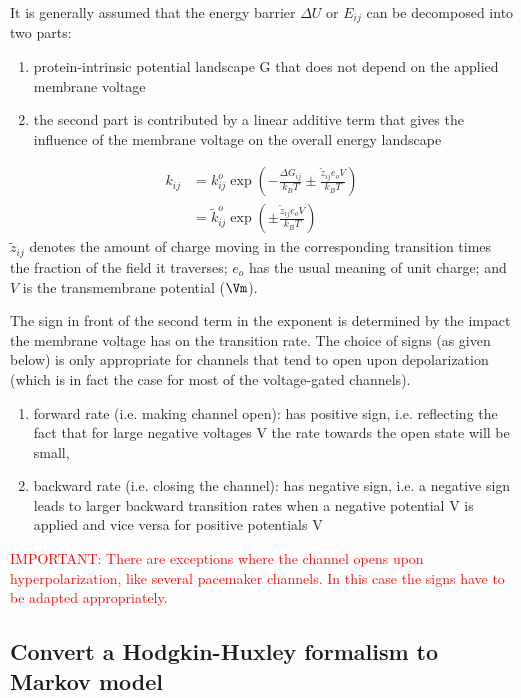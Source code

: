 It is generally assumed that the energy barrier $\Delta U$ or $E_{ij}$
can be decomposed into two parts:
\begin{enumerate}
  \item protein-intrinsic potential landscape G that does not depend on the applied
membrane voltage

   \item the second part is contributed by a linear additive term that gives
the influence of the membrane voltage on the overall energy landscape
\end{enumerate}

\begin{equation}
\begin{split}
k_{ij} &= k_{ij}^o \exp\left( - \frac{\Delta G_{ij}}{k_BT} \pm
\frac{\tilde{z}_{ij} e_o V}{k_BT} \right) \\
      &= \tilde{k}^o_{ij}  \exp\left( \pm
\frac{\tilde{z}_{ij} e_o V}{k_BT} \right)
\end{split}
\end{equation}
$\tilde{z}_{ij}$ denotes the amount of charge moving in the corresponding
transition times the fraction of the field it traverses; $e_o$ has the usual
meaning of unit charge; and $V$ is the transmembrane potential ($\Vm$).

The sign in front of the second term in the exponent is determined by the impact
the membrane voltage has on the transition rate. The choice of signs (as given
below) is only appropriate for channels that tend to open upon depolarization
(which is in fact the case for most of the voltage-gated channels).
\begin{enumerate}
  \item forward rate (i.e. making channel open): has positive sign, i.e.
  reflecting the fact that for large negative voltages V the rate towards the
  open state will be small,

  \item backward rate (i.e. closing the channel): has negative sign, i.e.
  a negative sign leads to larger backward transition rates when a negative
  potential V is applied and vice versa for positive potentials V
\end{enumerate}

\textcolor{red}{IMPORTANT: There are exceptions where the channel opens upon
hyperpolarization, like several pacemaker channels. In this case the signs have to be
adapted appropriately.}


\subsection{Convert a Hodgkin-Huxley formalism to Markov model}
\label{sec:HH-to-Markov}

